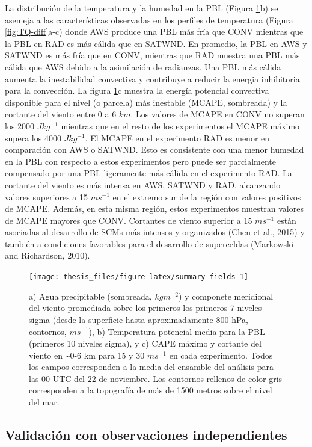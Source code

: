 \documentclass[12pt,oneside,a4paper]{reedthesis}
\begin{document}
La distribución de la temperatura y la humedad en la PBL (Figura \ref{fig:summary-fields}b) se asemeja a las características observadas en los perfiles de temperatura (Figura \ref{fig:TQ-diff}a-c) donde AWS produce una PBL más fría que CONV mientras que la PBL en RAD es más cálida que en SATWND. En promedio, la PBL en AWS y SATWND es más fría que en CONV, mientras que RAD muestra una PBL más cálida que AWS debido a la asimilación de radianzas. Una PBL más cálida aumenta la inestabilidad convectiva y contribuye a reducir la energia inhibitoria para la convección. La figura \ref{fig:summary-fields}c muestra la energía potencial convectiva disponible para el nivel (o parcela) más inestable (MCAPE, sombreada) y la cortante del viento entre 0 a 6 \(km\). Los valores de MCAPE en CONV no superan los 2000 \(Jkg^{-1}\) mientras que en el resto de los experimentos el MCAPE máximo supera los 4000 \(Jkg^{-1}\). El MCAPE en el experimento RAD es menor en comparación con AWS o SATWND. Esto es consistente con una menor humedad en la PBL con respecto a estos experimentos pero puede ser parcialmente compensado por una PBL ligeramente más cálida en el experimento RAD. La cortante del viento es más intensa en AWS, SATWND y RAD, alcanzando valores superiores a 15 \(ms^{-1}\) en el extremo sur de la región con valores positivos de MCAPE. Además, en esta misma región, estos experimentos muestran valores de MCAPE mayores que CONV. Cortantes de viento superior a 15 \(ms^{-1}\) están asociadas al desarrollo de SCMs más intensos y organizados (Chen et al., 2015) y también a condiciones favorables para el desarrollo de superceldas (Markowski and Richardson, 2010).


\begin{figure}
\texttt{[image: thesis\_files/figure-latex/summary-fields-1]} \caption{a) Agua precipitable (sombreada, \(kgm^{-2}\)) y componete meridional del viento promediada sobre los primeros los primeros 7 niveles sigma (desde la superficie hasta aproximadamente 800 hPa, contornos, \(ms^{-1}\)), b) Temperatura potencial media para la PBL (primeros 10 niveles sigma), y c) CAPE máximo y cortante del viento en \textasciitilde0-6 km para 15 y 30 \(ms^{-1}\) en cada experimento. Todos los campos corresponden a la media del ensamble del análisis para las 00 UTC del 22 de noviembre. Los contornos rellenos de color gris corresponden a la topografía de más de 1500 metros sobre el nivel del mar.}\label{fig:summary-fields}
\end{figure}
\hypertarget{val-analisis}{%
\subsection{Validación con observaciones independientes}\label{val-analisis}}
\end{document}
